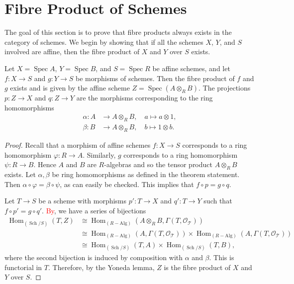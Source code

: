 \documentclass[12pt]{book}
\theoremstyle{definition}
\newcommand{\Hom}{\operatorname{Hom}}
\DeclareMathOperator{\Spec}{Spec}
\newcommand{\Schs}{\operatorname{Sch}}
\newcommand{\todo}[1]{\textcolor{red}{#1}}
\begin{document}
	\section{Fibre Product of Schemes}
	
	The goal of this section is to prove that fibre products always exists in the category of schemes. We begin by showing that if all the schemes $X$, $Y$, and $S$ involved are affine, then the fibre product of $X$ and $Y$ over $S$ exists.
	
	\begin{theorem}
		Let $X = \Spec A$, $Y = \Spec B$, and $S = \Spec R$ be affine schemes, and let $f \colon X \to S$ and $g \colon Y \to S$ be morphisms of schemes. Then the fibre product of $f$ and $g$ exists and is given by the affine scheme $Z = \Spec(A \otimes_R B)$. The projections $p \colon Z \to X$ and $q \colon Z \to Y$ are the morphisms corresponding to the ring homomorphisms
		\begin{align*}
			\alpha \colon A & \to A \otimes_R B, \quad a \mapsto a \otimes 1, \\
			\beta \colon B & \to A \otimes_R B, \quad b \mapsto 1 \otimes b.
		\end{align*}
	\end{theorem}
	\begin{proof}
		Recall that a morphism of affine schemes $f \colon X \to S$ corresponds to a ring homomorphism $\varphi\colon R \to A$. Similarly, $g$ corresponds to a ring homomorphism $\psi \colon R \to B$. Hence $A$ and $B$ are $R$-algebras and so the tensor product $A \otimes_R B$ exists. Let $\alpha, \beta$ be ring homomorphisms as defined in the theorem statement. Then $\alpha \circ \varphi = \beta \circ \psi$, as can easily be checked. This implies that $f \circ p = g \circ q$.
		
		Let $T \to S$ be a scheme with morphisms $p' \colon T \to X$ and $q' \colon T \to Y$ such that $f \circ p' = g \circ q'$. \todo{By}, we have a series of bijections
		\begin{align*}
			\Hom_{(\Schs/S)}(T, Z) & \cong \Hom_{(R-\mathrm{Alg})}(A \otimes_R B, \Gamma(T, \mathcal{O_T})) \\ 
			&  \cong \Hom_{(R-\mathrm{Alg})}(A, \Gamma(T, \mathcal{O_T})) \times \Hom_{(R-\mathrm{Alg})}(A, \Gamma(T, \mathcal{O_T})) \\
			& \cong \Hom_{(\Schs/S)}(T, A) \times \Hom_{(\Schs/S)}(T, B),
		\end{align*}
		where the second bijection is induced by composition with $\alpha$ and $\beta$. This is functorial in $T$. Therefore, by the Yoneda lemma, $Z$ is the fibre product of $X$ and $Y$ over $S$.
	\end{proof}
	
\end{document}
